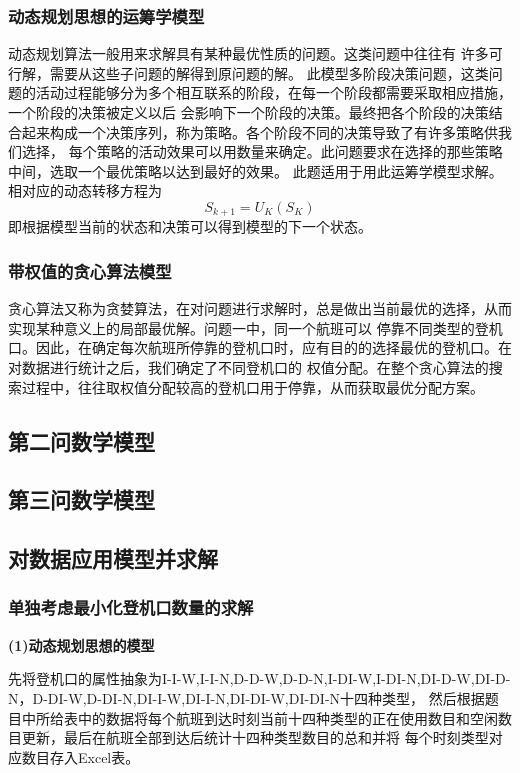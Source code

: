 \documentclass[bwprint]{gmcmthesis}
\begin{document}
\subsubsection{动态规划思想的运筹学模型}
动态规划算法一般用来求解具有某种最优性质的问题。这类问题中往往有
许多可行解，需要从这些子问题的解得到原问题的解。
此模型多阶段决策问题，这类问题的活动过程能够分为多个相互联系的阶段，在每一个阶段都需要采取相应措施，一个阶段的决策被定义以后
会影响下一个阶段的决策。最终把各个阶段的决策结合起来构成一个决策序列，称为策略。各个阶段不同的决策导致了有许多策略供我们选择，
每个策略的活动效果可以用数量来确定。此问题要求在选择的那些策略中间，选取一个最优策略以达到最好的效果。 此题适用于用此运筹学模型求解。
相对应的动态转移方程为
\begin{equation}
S_{k+1}=U_{K}\left ( S_{K} \right )
\end{equation}
即根据模型当前的状态和决策可以得到模型的下一个状态。
\subsubsection{带权值的贪心算法模型}
贪心算法又称为贪婪算法，在对问题进行求解时，总是做出当前最优的选择，从而实现某种意义上的局部最优解。问题一中，同一个航班可以
停靠不同类型的登机口。因此，在确定每次航班所停靠的登机口时，应有目的的选择最优的登机口。在对数据进行统计之后，我们确定了不同登机口的
权值分配。在整个贪心算法的搜索过程中，往往取权值分配较高的登机口用于停靠，从而获取最优分配方案。



\subsection{第二问数学模型}
\subsection{第三问数学模型}
\subsection{对数据应用模型并求解}
\subsubsection{单独考虑最小化登机口数量的求解}
\textbf{(1)动态规划思想的模型}

先将登机口的属性抽象为I-I-W,I-I-N,D-D-W,D-D-N,I-DI-W,I-DI-N,DI-D-W,DI-D-N，D-DI-W,D-DI-N,DI-I-W,DI-I-N,DI-DI-W,DI-DI-N十四种类型，
然后根据题目中所给表中的数据将每个航班到达时刻当前十四种类型的正在使用数目和空闲数目更新，最后在航班全部到达后统计十四种类型数目的总和并将
每个时刻类型对应数目存入Excel表。
\end{document}
